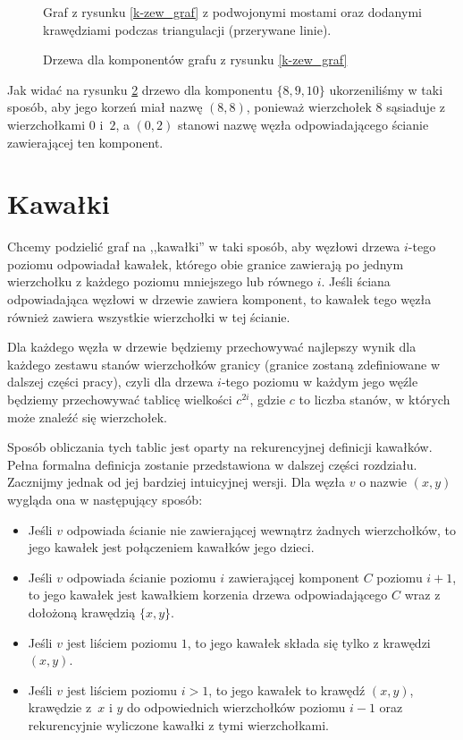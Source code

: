 \documentclass[twoside,a4paper,12pt]{report} %
\theoremstyle{break}
\begin{document}
\begin{figure}[ht]
    \centering
    
    \caption{Graf z rysunku \ref{k-zew_graf} z podwojonymi mostami oraz dodanymi krawędziami podczas triangulacji (przerywane linie).}
    \label{k-zew_trian}
\end{figure}

\begin{figure}[ht]
    \centering
    
    \caption{Drzewa dla komponentów grafu z rysunku \ref{k-zew_graf}}
    \label{k-zew_drzewa}
\end{figure}

Jak widać na rysunku \ref{k-zew_drzewa} drzewo dla komponentu $\{8,9,10\}$ ukorzeniliśmy w taki sposób, aby jego korzeń miał nazwę $(8,8)$, ponieważ wierzchołek $8$ sąsiaduje z wierzchołkami $0$ i~$2$, a $(0,2)$ stanowi nazwę węzła odpowiadającego ścianie zawierającej ten komponent.

\section{Kawałki}

Chcemy podzielić graf na ,,kawałki'' w taki sposób, aby węzłowi drzewa $i$-tego poziomu odpowiadał kawałek, którego obie granice zawierają po jednym wierzchołku z każdego poziomu mniejszego lub równego $i$. Jeśli ściana odpowiadająca węzłowi w drzewie zawiera komponent, to kawałek tego węzła również zawiera wszystkie wierzchołki w tej ścianie.

Dla każdego węzła w drzewie będziemy przechowywać najlepszy wynik dla każdego zestawu stanów wierzchołków granicy (granice zostaną zdefiniowane w dalszej części pracy), czyli dla drzewa $i$-tego poziomu w każdym jego węźle będziemy przechowywać tablicę wielkości $c^{2i}$, gdzie $c$ to liczba stanów, w których może znaleźć się wierzchołek.

Sposób obliczania tych tablic jest oparty na rekurencyjnej definicji kawałków. Pełna formalna definicja zostanie przedstawiona w dalszej części rozdziału. Zacznijmy jednak od jej bardziej intuicyjnej wersji. Dla węzła $v$ o nazwie $(x, y)$ wygląda ona w następujący sposób:
\begin{itemize}
    \item Jeśli $v$ odpowiada ścianie nie zawierającej wewnątrz żadnych wierzchołków, to jego kawałek jest połączeniem kawałków jego dzieci.
    \item Jeśli $v$ odpowiada ścianie poziomu $i$ zawierającej komponent $C$ poziomu $i+1$, to jego kawałek jest kawałkiem korzenia drzewa odpowiadającego $C$ wraz z dołożoną krawędzią $\{x, y\}$.
    \item Jeśli $v$ jest liściem poziomu $1$, to jego kawałek składa się tylko z krawędzi $(x, y)$.
    \item Jeśli $v$ jest liściem poziomu $i > 1$, to jego kawałek to krawędź $(x, y)$, krawędzie z~$x$ i $y$ do odpowiednich wierzchołków poziomu $i-1$ oraz rekurencyjnie wyliczone kawałki z tymi wierzchołkami.
\end{itemize}
\end{document}

